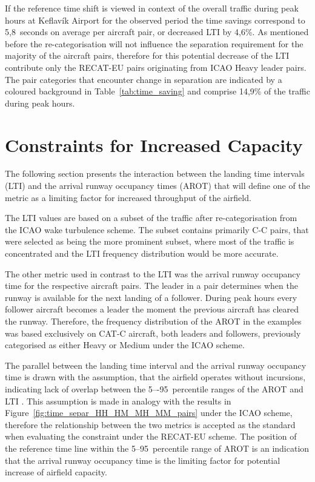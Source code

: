 If the reference time shift is viewed in context of the overall traffic during peak hours at Keflavík Airport for the observed period the time savings correspond to 5,8~seconds on average per aircraft pair, or decreased LTI by 4,6\%. As mentioned before the re-categorisation will not influence the separation requirement for the majority of the aircraft pairs, therefore for this potential decrease of the LTI contribute only the RECAT-EU pairs originating from ICAO Heavy leader pairs. The pair categories that encounter change in separation are indicated by a coloured background in Table~\ref{tab:time_saving} and comprise 14,9\% of the traffic during peak hours.


\section{Constraints for Increased Capacity}%

The following section presents the interaction between the landing time intervals (LTI) and the arrival runway occupancy times (AROT) that will define one of the metric as a limiting factor for increased throughput of the airfield. 

The LTI values are based on a subset of the traffic after re-categorisation from the ICAO wake turbulence scheme. The subset contains primarily C-C pairs, that were selected as being the more prominent subset, where most of the traffic is concentrated and the LTI frequency distribution would be more accurate. 

The other metric used in contrast to the LTI was the arrival runway occupancy time for the respective aircraft pairs. The leader in a pair determines when the runway is available for the next landing of a follower. During peak hours every follower aircraft becomes a leader the moment the previous aircraft has cleared the runway. Therefore, the frequency distribution of the AROT in the examples was based exclusively on CAT-C aircraft, both leaders and followers, previously categorised as either Heavy or Medium under the ICAO scheme.

The parallel between the landing time interval and the arrival runway occupancy time is drawn with the assumption, that the airfield operates without incursions, indicating lack of overlap between the 5–-95~percentile ranges of the AROT and LTI . This assumption is made in analogy with the results in Figure~\ref{fig:time_separ_HH_HM_MH_MM_pairs} under the ICAO scheme, therefore the relationship between the two metrics is accepted as the standard when evaluating the constraint under the RECAT-EU scheme. The position of the reference time line within the 5–95~percentile range of AROT is an indication that the arrival runway occupancy time is the limiting factor for potential increase of airfield capacity. 


